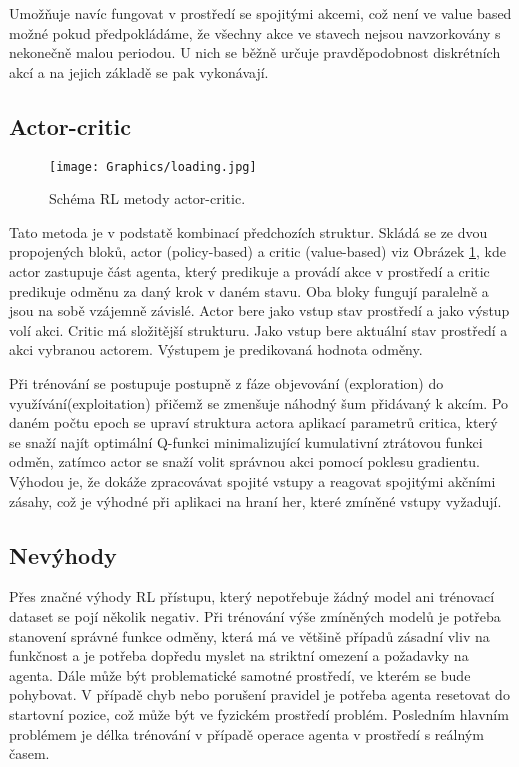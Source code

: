 \documentclass[czech, bc, kky, he, iso690alph]{fasthesis}
\begin{document}
	            Umožňuje navíc fungovat v prostředí se spojitými akcemi, což není ve value based možné pokud předpokládáme, že všechny akce ve stavech nejsou navzorkovány s nekonečně malou periodou. U nich se běžně určuje pravděpodobnost diskrétních akcí a na jejich základě se pak vykonávají.
            
            \subsection{Actor-critic}
            		
            		\begin{figure}[h]
            			\centering
            			\texttt{[image: Graphics/loading.jpg]}
            			\caption{Schéma RL metody actor-critic.}
            			\label{pic:actor_critic}
            		\end{figure}
            		
	            Tato metoda je v podstatě kombinací předchozích struktur. Skládá se ze dvou propojených bloků, actor (policy-based) a critic (value-based) viz Obrázek \ref{pic:actor_critic}, kde actor zastupuje část agenta, který predikuje a provádí akce v prostředí a critic predikuje odměnu za daný krok v daném stavu. Oba bloky fungují paralelně a jsou na sobě vzájemně závislé. Actor bere jako vstup stav prostředí a jako výstup volí akci. Critic má složitější strukturu. Jako vstup bere aktuální stav prostředí a akci vybranou actorem. Výstupem je predikovaná hodnota odměny.
	            
	            Při trénování se postupuje postupně z fáze objevování (exploration) do využívání(exploitation) přičemž se zmenšuje náhodný šum přidávaný k akcím. Po daném počtu epoch se upraví struktura actora aplikací parametrů critica, který se snaží najít optimální Q-funkci minimalizující kumulativní ztrátovou funkci odměn, zatímco actor se snaží volit správnou akci pomocí poklesu gradientu. Výhodou je, že dokáže zpracovávat spojité vstupy a reagovat spojitými akčními zásahy, což je výhodné při aplikaci na hraní her, které zmíněné vstupy vyžadují.
	            
        	\subsection{Nevýhody}
        		Přes značné výhody RL přístupu, který nepotřebuje žádný model ani trénovací dataset se pojí několik negativ. Při trénování výše zmíněných modelů je potřeba stanovení správné funkce odměny, která má ve většině případů zásadní vliv na funkčnost a je potřeba dopředu myslet na striktní omezení a požadavky na agenta. Dále může být problematické samotné prostředí, ve kterém se bude pohybovat. V případě chyb nebo porušení pravidel je potřeba agenta resetovat do startovní pozice, což může být ve fyzickém prostředí problém. Posledním hlavním problémem je délka trénování v případě operace agenta v prostředí s reálným časem.
            
\end{document}
